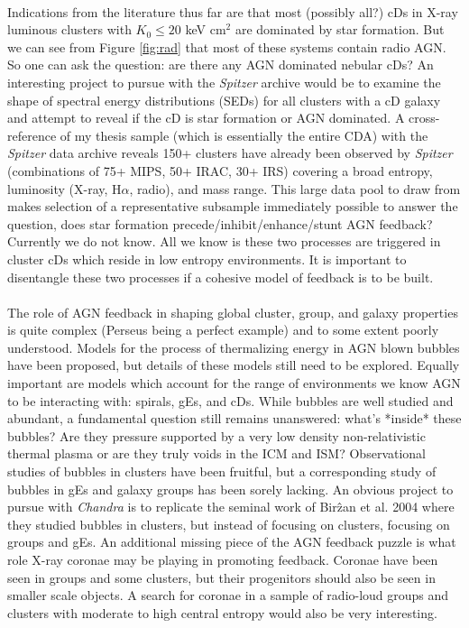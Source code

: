 \documentclass[11pt]{article}
\begin{document}
\\
Indications from the literature thus far are that most (possibly all?)
cDs in X-ray luminous clusters with $K_0 \leq 20$ keV cm$^2$ are
dominated by star formation. But we can see from Figure \ref{fig:rad}
that most of these systems contain radio AGN. So one can ask the
question: are there any AGN dominated nebular cDs? An interesting
project to pursue with the {\it Spitzer} archive would be to examine
the shape of spectral energy distributions (SEDs) for all clusters
with a cD galaxy and attempt to reveal if the cD is star formation or
AGN dominated. A cross-reference of my thesis sample (which is
essentially the entire CDA) with the {\it Spitzer} data archive
reveals 150+ clusters have already been observed by {\it Spitzer}
(combinations of 75+ MIPS, 50+ IRAC, 30+ IRS) covering a broad
entropy, luminosity (X-ray, H$\alpha$, radio), and mass range. This
large data pool to draw from makes selection of a representative subsample
immediately possible to answer the question, does star formation
precede/inhibit/enhance/stunt AGN feedback? Currently we do not
know. All we know is these two processes are triggered in cluster cDs
which reside in low entropy environments. It is important to
disentangle these two processes if a cohesive model of feedback is to
be built.\\

\\
The role of AGN feedback in shaping global cluster, group, and galaxy
properties is quite complex (Perseus being a perfect example) and to some extent poorly
understood. Models for the process of thermalizing energy in AGN blown
bubbles have been proposed, but details of these models still need to
be explored. Equally important are models which account for the range
of environments we know AGN to be interacting with: spirals, gEs, and cDs.
While bubbles are well studied and abundant, a fundamental question
still remains unanswered: what's *inside* these bubbles? Are they
pressure supported by a very low density non-relativistic thermal
plasma or are they truly voids in the ICM and ISM? Observational
studies of bubbles in clusters have been fruitful, but a corresponding
study of bubbles in gEs and galaxy groups has been sorely lacking. An
obvious project to pursue with {\it Chandra} is to replicate the
seminal work of Bir\^{z}an et al. 2004 where they studied bubbles in
clusters, but instead of focusing on clusters, focusing on groups and
gEs. An additional missing piece of the AGN feedback puzzle is what
role X-ray coronae may be playing in promoting feedback. Coronae
have been seen in groups and some clusters, but their progenitors
should also be seen in smaller scale objects. A search for coronae in
a sample of radio-loud groups and clusters with moderate to high
central entropy would also be very interesting.
\end{document}
